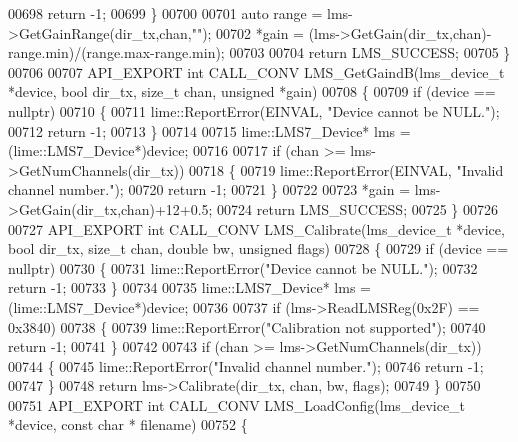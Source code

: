 \begin{DoxyCode}
00698         \textcolor{keywordflow}{return} -1;
00699     \}
00700 
00701     \textcolor{keyword}{auto} range = lms->GetGainRange(dir\_tx,chan,\textcolor{stringliteral}{""});
00702     *gain = (lms->GetGain(dir\_tx,chan)-range.min)/(range.max-range.min);
00703 
00704     \textcolor{keywordflow}{return} LMS_SUCCESS;
00705 \}
00706 
00707 API_EXPORT \textcolor{keywordtype}{int} CALL_CONV LMS_GetGaindB(lms_device_t *device, \textcolor{keywordtype}{bool} dir_tx, \textcolor{keywordtype}{size\_t} 
      chan, \textcolor{keywordtype}{unsigned} *gain)
00708 \{
00709     \textcolor{keywordflow}{if} (device == \textcolor{keyword}{nullptr})
00710     \{
00711         lime::ReportError(EINVAL, \textcolor{stringliteral}{"Device cannot be NULL."});
00712         \textcolor{keywordflow}{return} -1;
00713     \}
00714 
00715     lime::LMS7_Device* lms = (lime::LMS7_Device*)device;
00716 
00717     \textcolor{keywordflow}{if} (chan >= lms->GetNumChannels(dir\_tx))
00718     \{
00719         lime::ReportError(EINVAL, \textcolor{stringliteral}{"Invalid channel number."});
00720         \textcolor{keywordflow}{return} -1;
00721     \}
00722 
00723     *gain = lms->GetGain(dir\_tx,chan)+12+0.5;
00724     \textcolor{keywordflow}{return} LMS_SUCCESS;
00725 \}
00726 
00727 API_EXPORT \textcolor{keywordtype}{int} CALL_CONV LMS_Calibrate(lms_device_t *device, \textcolor{keywordtype}{bool} dir_tx, \textcolor{keywordtype}{size\_t} 
      chan, \textcolor{keywordtype}{double} bw, \textcolor{keywordtype}{unsigned} flags)
00728 \{
00729     \textcolor{keywordflow}{if} (device == \textcolor{keyword}{nullptr})
00730     \{
00731         lime::ReportError(\textcolor{stringliteral}{"Device cannot be NULL."});
00732         \textcolor{keywordflow}{return} -1;
00733     \}
00734 
00735     lime::LMS7_Device* lms = (lime::LMS7_Device*)device;
00736 
00737     \textcolor{keywordflow}{if} (lms->ReadLMSReg(0x2F) == 0x3840)
00738     \{
00739         lime::ReportError(\textcolor{stringliteral}{"Calibration not supported"});
00740         \textcolor{keywordflow}{return} -1;
00741     \}
00742 
00743     \textcolor{keywordflow}{if} (chan >= lms->GetNumChannels(dir\_tx))
00744     \{
00745         lime::ReportError(\textcolor{stringliteral}{"Invalid channel number."});
00746         \textcolor{keywordflow}{return} -1;
00747     \}
00748     \textcolor{keywordflow}{return} lms->Calibrate(dir\_tx, chan, bw, flags);
00749 \}
00750 
00751 API_EXPORT \textcolor{keywordtype}{int} CALL_CONV LMS_LoadConfig(lms_device_t *device, \textcolor{keyword}{const} \textcolor{keywordtype}{char} *
      filename)
00752 \{

\end{DoxyCode}
